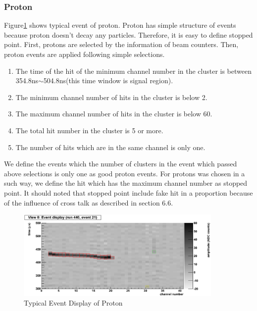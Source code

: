 \subsubsection{Proton}

Figure\ref{fig:Proton_Event_Display} shows typical event of proton.
Proton has simple structure of events because proton doesn't decay any particles.
Therefore, it is easy to define stopped point.
First, protons are selected by the information of beam counters.
Then, proton events are applied following simple selections.\\

\begin{enumerate}
\item The time of the hit of the minimum channel number in the cluster is between 354.8ns$\sim$504.8ns(this time window is signal region). \\
\item The minimum channel number of hits in the cluster is below 2. \\
\item The maximum channel number of hits in the cluster is below 60. \\
\item The total hit number in the cluster is 5 or more. \\
\item The number of hits which are in the same channel is only one. \\
\end{enumerate}

We define the events which the number of clusters in the event which passed above selections is only one as good proton events.
For protons was chosen in a such way, we define the hit which has the maximum channel number as stopped point.
It should noted that stopped point include fake hit in a proportion because of the influence of cross talk as described in section 6.6.\\

\begin{figure}[htbp]
  \centering
  \includegraphics[width=10cm,clip]{./fig/Display_run440_ev21.eps}
  \caption{Typical Event Display of Proton}
  \label{fig:Proton_Event_Display}
\end{figure}
